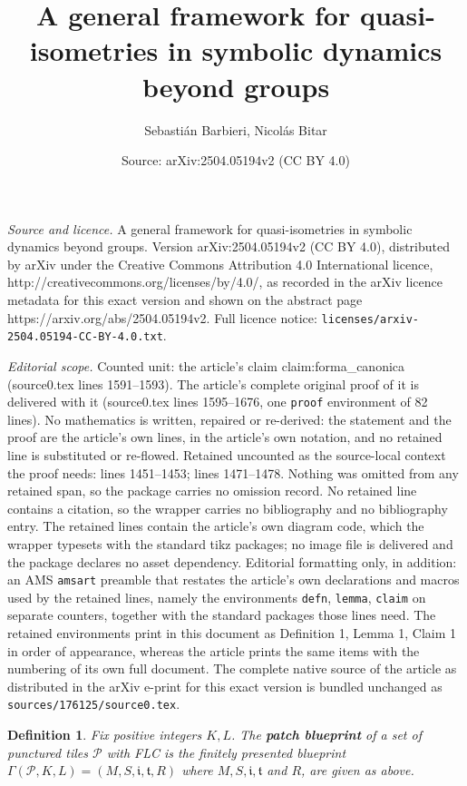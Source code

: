 \documentclass[10pt,a4paper]{amsart}
\title{A general framework for quasi-isometries in symbolic dynamics beyond groups}
\author{Sebasti\'an Barbieri, Nicol\'as Bitar}
\date{Source: arXiv:2504.05194v2 (CC BY 4.0)}
\newtheorem{defn}{Definition}
\newcommand{\PP}{\mathcal{P}}
\newcommand{\define}[1]{\textbf{#1}}
\newcommand{\init}{\mathfrak{i}}
\newcommand{\ter}{\mathfrak{t}}
\begin{document}
\maketitle

\noindent\emph{Source and licence.} A general framework for quasi-isometries in symbolic dynamics beyond groups. Version arXiv:2504.05194v2 (CC BY 4.0), distributed by arXiv under the Creative Commons Attribution 4.0 International licence, http://creativecommons.org/licenses/by/4.0/, as recorded in the arXiv licence metadata for this exact version and shown on the abstract page https://arxiv.org/abs/2504.05194v2. Full licence notice: \texttt{licenses/arxiv-2504.05194-CC-BY-4.0.txt}.\par\smallskip

\noindent\textit{Editorial scope.} Counted unit: the article's claim claim:forma\_canonica (source0.tex lines 1591--1593). The article's complete original proof of it is delivered with it (source0.tex lines 1595--1676, one \texttt{proof} environment of 82 lines). No mathematics is written, repaired or re-derived: the statement and the proof are the article's own lines, in the article's own notation, and no retained line is substituted or re-flowed.  Retained uncounted as the source-local context the proof needs: lines 1451--1453; lines 1471--1478.  Nothing was omitted from any retained span, so the package carries no omission record.  No retained line contains a citation, so the wrapper carries no bibliography and no bibliography entry.  The retained lines contain the article's own diagram code, which the wrapper typesets with the standard tikz packages; no image file is delivered and the package declares no asset dependency.  Editorial formatting only, in addition: an AMS \texttt{amsart} preamble that restates the article's own declarations and macros used by the retained lines, namely the environments \texttt{defn}, \texttt{lemma}, \texttt{claim} on separate counters, together with the standard packages those lines need.  The retained environments print in this document as Definition 1, Lemma 1, Claim 1 in order of appearance, whereas the article prints the same items with the numbering of its own full document.  The complete native source of the article as distributed in the arXiv e-print for this exact version is bundled unchanged as \texttt{sources/176125/source0.tex}.
\begin{defn}\label{def:patchblueprint}
    Fix positive integers $K,L$. The \define{patch blueprint} of a set of punctured tiles $\PP$ with FLC is the finitely presented blueprint $\Gamma(\PP,K,L) = (M,S,\init,\ter,R)$ where $M, S, \init,\ter$ and $R$, are given as above.
\end{defn}
\end{document}
